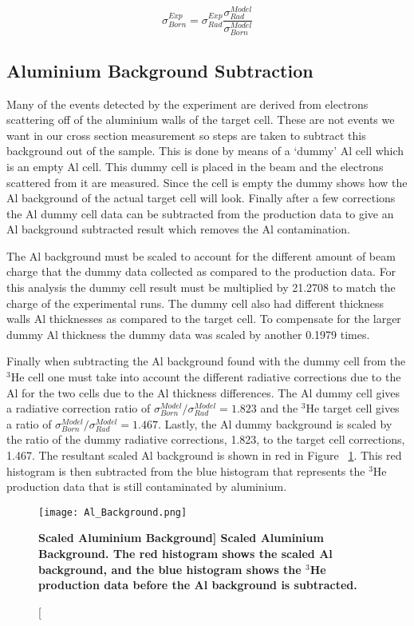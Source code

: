 \begin{equation} \label{eq:rc}
	\sigma^{Exp}_{Born} = \sigma^{Exp}_{Rad} \frac{\sigma^{Model}_{Rad}}{\sigma^{Model}_{Born}}
\end{equation}

\subsection{Aluminium Background Subtraction}
\label{ssec:al}

Many of the events detected by the experiment are derived from electrons scattering off of the aluminium walls of the target cell. These are not events we want in our cross section measurement so steps are taken to subtract this background out of the sample. This is done by means of a `dummy' Al cell which is an empty Al cell. This dummy cell is placed in the beam and the electrons scattered from it are measured. Since the cell is empty the dummy shows how the Al background of the actual target cell will look. Finally after a few corrections the Al dummy cell data can be subtracted from the production data to give an Al background subtracted result which removes the Al contamination.

The Al background must be scaled to account for the different amount of beam charge that the dummy data collected as compared to the production data. For this analysis the dummy cell result must be multiplied by 21.2708 to match the charge of the experimental runs. The dummy cell also had different thickness walls Al thicknesses as compared to the target cell. To compensate for the larger dummy Al thickness the dummy data was scaled by another 0.1979 times.

Finally when subtracting the Al background found with the dummy cell from the $^3$He cell one must take into account the different radiative corrections due to the Al for the two cells due to the Al thickness differences. The Al dummy cell gives a radiative correction ratio of $\sigma^{Model}_{Born}/\sigma^{Model}_{Rad} = 1.823$ and the $^3$He target cell gives a ratio of $\sigma^{Model}_{Born}/\sigma^{Model}_{Rad} = 1.467$. Lastly, the Al dummy background is scaled by the ratio of the dummy radiative corrections, 1.823, to the target cell corrections, 1.467. The resultant scaled Al background is shown in red in Figure ~\ref{fig:al}. This red histogram is then subtracted from the blue histogram that represents the $^3$He production data that is still contaminated by aluminium. 

\begin{figure}[!ht]
\begin{center}
\texttt{[image: Al\_Background.png]}
\end{center}
\caption[\bf{Scaled Aluminium Background}]{
{\bf{Scaled Aluminium Background.}} The red histogram shows the scaled Al background, and the blue histogram shows the $^3$He production data before the Al background is subtracted.}
\label{fig:al}
\end{figure}

